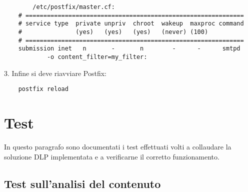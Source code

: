     \begin{verbatim}
        /etc/postfix/master.cf:
    # =============================================================
    # service type  private unpriv  chroot  wakeup  maxproc command
    #               (yes)   (yes)   (yes)   (never) (100)
    # =============================================================
    submission inet   n       -       n        -      -      smtpd
            -o content_filter=my_filter:  
    \end{verbatim}
    3. Infine si deve riavviare Postfix:

    \begin{verbatim}
    postfix reload 
    \end{verbatim}
    
\pagebreak
    \section{Test}
    In questo paragrafo sono documentati i test effettuati volti a collaudare la soluzione DLP 
    implementata e a verificarne il corretto funzionamento.

    \subsection{Test sull'analisi del contenuto}



